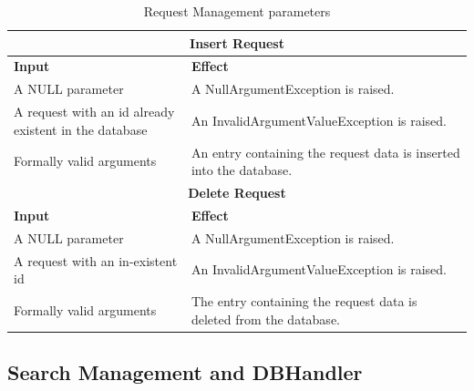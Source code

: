 \documentclass[a4paper, hidelinks, 12pt]{report}
\begin{document}
	\begin{table}[h!]
		\centering
		\begin{tabular}{|p{6cm}|p{9cm}|}
			\hline\hline
			\multicolumn{2}{c}{\textbf{Insert Request}} \\
			\hline
			\textbf{Input} & \textbf{Effect} \\ [0.5ex]
			\hline
			A NULL parameter & A NullArgumentException is raised.  \\
			\hline
			A request with an id already existent in the database & An InvalidArgumentValueException is raised.\\
			\hline
			Formally valid arguments & An entry containing the request data is inserted into the database.\\
			\hline\hline
			\multicolumn{2}{c}{\textbf{Delete Request}} \\
			\hline
			\textbf{Input} & \textbf{Effect} \\ [0.5ex]
			\hline
			A NULL parameter & A NullArgumentException is raised.  \\
			\hline
			A request with an in-existent id & An InvalidArgumentValueException is raised.\\
			\hline
			Formally valid arguments & The entry containing the request data is deleted from the database.\\
			\hline
		\end{tabular}
		\caption{Request Management parameters}
		
		\label{fig:Request Management parameters}
	\end{table}
	
	\subsection{Search Management and DBHandler}
\end{document}
